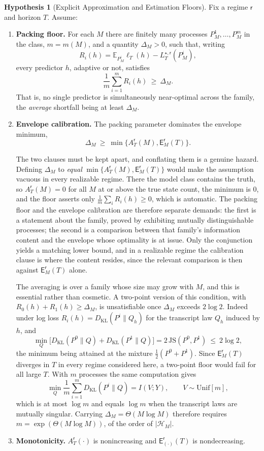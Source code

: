 \documentclass[12pt]{article}
\theoremstyle{definition}
\newtheorem{assumption}[theorem]{Hypothesis}
\newcommand{\Est}{\mathsf E}
\newcommand{\Aapp}{A_T}
\newcommand{\KL}{D_{\mathrm{KL}}}
\begin{document}
\begin{assumption}[Explicit Approximation and Estimation Floors]
\label{ass:oracle-floors}
Fix a regime $\mathsf r$ and horizon $T$.  Assume:
\begin{enumerate}[label=(\roman*)]
\item \textbf{Packing floor.}
For each $M$ there are finitely many processes $P_M^{1},\dots,P_M^{m}$ in the
class, $m=m(M)$, and a quantity $\Delta_M>0$, such that, writing
\[
R_i(h)
=
\mathbb E_{P_M^{i}}\ell_T(h)-L_T^{\star,\mathsf r}(P_M^{i}),
\]
every predictor $h$, adaptive or not, satisfies
\[
\frac1m\sum_{i=1}^{m}R_i(h)\ \ge\ \Delta_M .
\]
That is, no single predictor is simultaneously near-optimal across the family,
the \emph{average} shortfall being at least $\Delta_M$.

\item \textbf{Envelope calibration.}
The packing parameter dominates the envelope minimum,
\[
\Delta_M\ \ge\ \min\bigl\{\Aapp^{\mathsf r}(M),\Est_M^{\mathsf r}(T)\bigr\} .
\]

The two clauses must be kept apart, and conflating them is a genuine hazard.
Defining $\Delta_M$ to \emph{equal} $\min\{\Aapp^{\mathsf r}(M),
\Est_M^{\mathsf r}(T)\}$ would make the assumption vacuous in every realizable
regime.  There the model class contains the truth, so
$\Aapp^{\mathsf r}(M)=0$ for all $M$ at or above the true state count, the
minimum is $0$, and the floor asserts only $\frac1m\sum_iR_i(h)\ge0$, which is
automatic.  The packing floor and the envelope calibration are therefore
separate demands: the first is a statement about the family, proved by
exhibiting mutually distinguishable processes; the second is a comparison
between that family's information content and the envelope whose optimality is
at issue.  Only the conjunction yields a matching lower bound, and in a
realizable regime the calibration clause is where the content resides, since
the relevant comparison is then against $\Est_M^{\mathsf r}(T)$ alone.

The averaging is over a family whose size may grow with $M$, and this is
essential rather than cosmetic.  A two-point version of this condition, with
$R_0(h)+R_1(h)\ge\Delta_M$, is unsatisfiable once $\Delta_M$ exceeds
$2\log2$.  Indeed under log loss $R_i(h)=\KL(P^i\|Q_h)$ for the transcript law
$Q_h$ induced by $h$, and
\[
\min_{Q}\bigl[\KL(P^0\|Q)+\KL(P^1\|Q)\bigr]
=
2\,\mathrm{JS}(P^0,P^1)
\ \le\
2\log2,
\]
the minimum being attained at the mixture $\tfrac12(P^0+P^1)$.  Since
$\Est_M^{\mathsf r}(T)$ diverges in $T$ in every regime considered here, a
two-point floor would fail for all large $T$.  With $m$ processes the same
computation gives
\[
\min_Q\frac1m\sum_{i=1}^m\KL(P^i\|Q)
=
I(V;Y),
\qquad V\sim\mathrm{Unif}[m],
\]
which is at most $\log m$ and equals $\log m$ when the transcript laws are
mutually singular.  Carrying $\Delta_M=\Theta(M\log M)$ therefore requires
$m=\exp(\Theta(M\log M))$, of the order of $|\mathcal H_M|$.
\item \textbf{Monotonicity.}
$\Aapp^{\mathsf r}(\cdot)$ is nonincreasing and
$\Est^{\mathsf r}_{(\cdot)}(T)$ is nondecreasing.
\end{enumerate}
\end{assumption}
\end{document}
